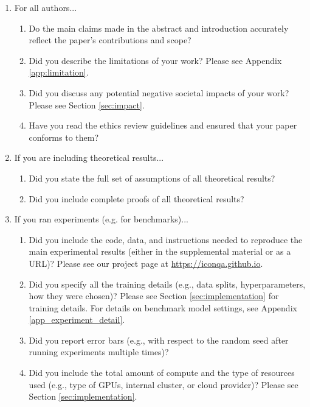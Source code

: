 \documentclass{article}
\begin{document}
\begin{enumerate}

\item For all authors...
\begin{enumerate}
  \item Do the main claims made in the abstract and introduction accurately reflect the paper's contributions and scope?
    \answerYes{}
  \item Did you describe the limitations of your work?
    \answerYes{} Please see Appendix \ref{app:limitation}.
  \item Did you discuss any potential negative societal impacts of your work?
    \answerYes{} Please see Section \ref{sec:impact}.
  \item Have you read the ethics review guidelines and ensured that your paper conforms to them?
    \answerYes{}
\end{enumerate}

\item If you are including theoretical results...
\begin{enumerate}
  \item Did you state the full set of assumptions of all theoretical results?
    \answerNA{}
	\item Did you include complete proofs of all theoretical results?
    \answerNA{}
\end{enumerate}

\item If you ran experiments (e.g. for benchmarks)...
\begin{enumerate}
  \item Did you include the code, data, and instructions needed to reproduce the main experimental results (either in the supplemental material or as a URL)?
    \answerYes{} Please see our project page at \url{https://iconqa.github.io}.
  \item Did you specify all the training details (e.g., data splits, hyperparameters, how they were chosen)?
    \answerYes{} Please see Section \ref{sec:implementation} for training details. For details on benchmark model settings, see Appendix \ref{app_experiment_detail}.
	\item Did you report error bars (e.g., with respect to the random seed after running experiments multiple times)?
    \answerNA{}
	\item Did you include the total amount of compute and the type of resources used (e.g., type of GPUs, internal cluster, or cloud provider)?
    \answerYes{} Please see Section \ref{sec:implementation}. 
\end{enumerate}


\end{enumerate}
\end{document}
